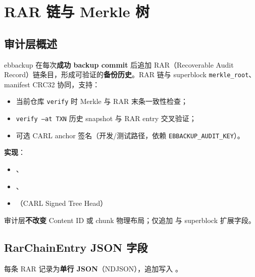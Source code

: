 \chapter{RAR 链与 Merkle 树}
\label{ch:audit-rar-v4}

\section{审计层概述}

ebbackup 在每次\textbf{成功 backup commit} 后追加 RAR（Recoverable Audit Record）链条目，形成可验证的\textbf{备份历史}。RAR 链与 superblock \texttt{merkle\_root}、manifest CRC32 协同，支持：
\begin{itemize}[nosep]
  \item 当前仓库 \texttt{verify} 时 Merkle 与 RAR 末条一致性检查；
  \item \texttt{verify --at TXN} 历史 snapshot 与 RAR entry 交叉验证；
  \item 可选 CARL anchor 签名（开发/测试路径，依赖 \texttt{EBBACKUP\_AUDIT\_KEY}）。
\end{itemize}

\textbf{实现}：
\begin{itemize}[nosep]
  \item {}、
  \item {}、
  \item {}（CARL Signed Tree Head）
\end{itemize}

审计层\textbf{不改变} Content ID 或 chunk 物理布局；仅追加  与 superblock 扩展字段。

\section{RarChainEntry JSON 字段}

每条 RAR 记录为\textbf{单行 JSON}（NDJSON），追加写入 。

